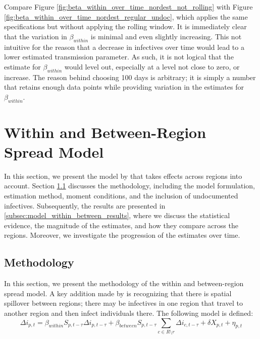 \documentclass[12pt]{article}
\begin{document}
	Compare Figure \ref{fig:beta_within_over_time_nordest_not_rolling} with Figure \ref{fig:beta_within_over_time_nordest_regular_undoc}, which applies the same specifications but without applying the rolling window. It is immediately clear that the variation in $\beta_{within}$ is minimal and even slightly increasing. This not intuitive for the reason that a decrease in infectives over time would lead to a lower estimated transmission parameter. As such, it is not logical that the estimate for $\beta_{within}$ would level out, especially at a level not close to zero, or increase. The reason behind choosing 100 days is arbitrary; it is simply a number that retains enough data points while providing variation in the estimates for $\beta_{within}$.
	
	\section{Within and Between-Region Spread Model} \label{sec:model_within_between}
	In this section, we present the model by \textcite{adda2016economic} that takes effects across regions into account. Section \ref{subsec:model_within_between_methodology} discusses the methodology, including the model formulation, estimation method, moment conditions, and the inclusion of undocumented infectives. Subsequently, the results are presented in \ref{subsec:model_within_between_results}, where we discuss the statistical evidence, the magnitude of the estimates, and how they compare across the regions. Moreover, we investigate the progression of the estimates over time.
	
	\subsection{Methodology} \label{subsec:model_within_between_methodology}
	In this section, we present the methodology of the within and between-region spread model. A key addition made by \textcite{adda2016economic} is recognizing that there is spatial spillover between regions; there may be infectives in one region that travel to another region and then infect individuals there. The following model is defined:
	\begin{equation} \label{eq:model_within_between}
	    \Delta i_{p,t} = \beta_{within}S_{p,t-\tau}\Delta i_{p,t-\tau} + \beta_{between}S_{p,t-\tau} \sum_{c \in R \setminus r} \Delta i_{c, t-\tau} + \delta X_{p,t} + \eta_{p,t}
	\end{equation}
	
\end{document}
